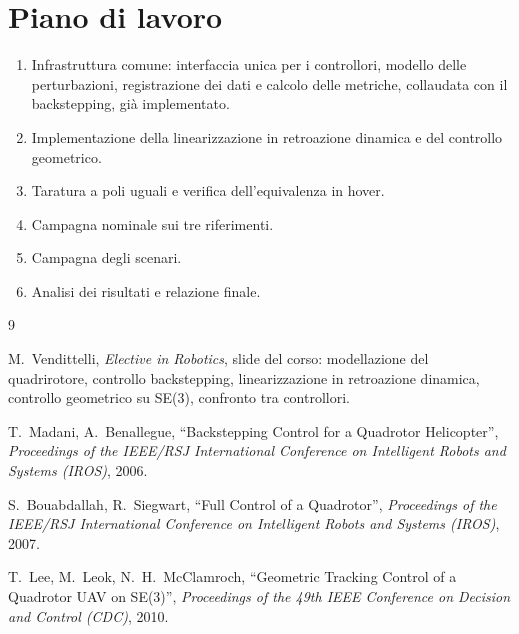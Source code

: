 \documentclass[11pt,a4paper]{article}
\begin{document}
\section{Piano di lavoro}

\begin{enumerate}
  \item Infrastruttura comune: interfaccia unica per i controllori, modello delle perturbazioni, registrazione dei dati e calcolo delle metriche, collaudata con il backstepping, già implementato.
  \item Implementazione della linearizzazione in retroazione dinamica e del controllo geometrico.
  \item Taratura a poli uguali e verifica dell'equivalenza in hover.
  \item Campagna nominale sui tre riferimenti.
  \item Campagna degli scenari.
  \item Analisi dei risultati e relazione finale.
\end{enumerate}

\begin{thebibliography}{9}

M.~Vendittelli, \emph{Elective in Robotics}, slide del corso: modellazione del quadrirotore, controllo backstepping, linearizzazione in retroazione dinamica, controllo geometrico su SE(3), confronto tra controllori.

T.~Madani, A.~Benallegue, ``Backstepping Control for a Quadrotor Helicopter'', \emph{Proceedings of the IEEE/RSJ International Conference on Intelligent Robots and Systems (IROS)}, 2006.

S.~Bouabdallah, R.~Siegwart, ``Full Control of a Quadrotor'', \emph{Proceedings of the IEEE/RSJ International Conference on Intelligent Robots and Systems (IROS)}, 2007.

T.~Lee, M.~Leok, N.~H.~McClamroch, ``Geometric Tracking Control of a Quadrotor UAV on SE(3)'', \emph{Proceedings of the 49th IEEE Conference on Decision and Control (CDC)}, 2010.

\end{thebibliography}
\end{document}
